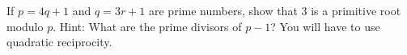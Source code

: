 \section{}

If $p = 4q+1$ and $q = 3r + 1$ are prime numbers, show that $3$ is a primitive
root modulo $p$. Hint: What are the prime divisors of $p-1$? You will have to
use quadratic reciprocity.
